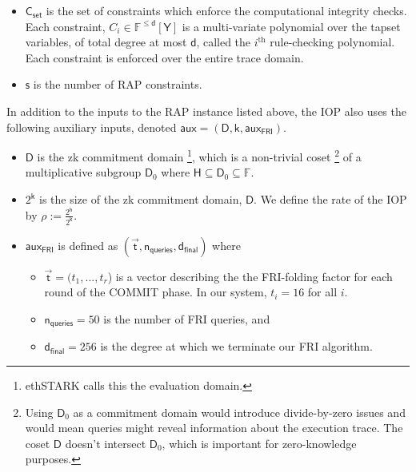 \documentclass[10pt,letterpaper,titlepage]{article}
\theoremstyle{definition}
\begin{document}
\begin{itemize}
  \footnote{A tap is a reference to an entry in the trace; the constraints are expressed as a function of various taps. For more details on taps, see Appendix \ref{taps}. Note that ethSTARK uses the term \textit{mask} where we use \textit{tapset}.}. 
  \item $\mathsf{C}_\mathsf{set}$ is the set of constraints which enforce the computational integrity checks. 
  Each constraint, $C_i\in\mathbb{F}^{\leq \mathsf{d}}[\mathsf{Y}]$ is a multi-variate polynomial over the tapset variables, of total degree at most $\mathsf{d}$, called the $i^\text{th}$ rule-checking polynomial. 
  Each constraint is enforced over the entire trace domain.
  \item $\mathsf{s}$ is the number of RAP constraints.
\end{itemize} 
In addition to the inputs to the RAP instance listed above, the IOP also uses the following auxiliary inputs, denoted $\mathsf{aux}=(\mathsf{D},\mathsf{k},\mathsf{aux}_\mathsf{FRI})$.
\begin{itemize}
  \item $\mathsf{D}$ is the zk commitment domain%
  \footnote{ethSTARK calls this the evaluation domain.}, which is a non-trivial coset%
  \footnote{Using $\mathsf{D}_0$ as a commitment domain would introduce divide-by-zero issues and would mean queries might reveal information about the execution trace. 
  The coset $\mathsf{D}$ doesn't intersect $\mathsf{D}_0$, which is important for zero-knowledge purposes.}
  of a multiplicative subgroup $\mathsf{D}_0$ where $\mathsf{H}\subseteq\mathsf{D}_0\subseteq\mathbb{F}$.
  \item $2^\mathsf{k}$ is the size of the zk commitment domain, $\mathsf{D}$. 
  We define the rate of the IOP by $\rho := \frac{2^\mathsf{h}}{2^\mathsf{k}}$. 
  \item $\mathsf{aux}_\mathsf{FRI}$ is defined as $(\vec{\mathsf{t}},\mathsf{n_{queries}}, \mathsf{d_{final}})$ where 
    \begin{itemize}
      \item $\vec{\mathsf{t}}=(t_1,...,t_r$) is a vector describing the the FRI-folding factor for each round of the COMMIT phase. In our system, $t_i=16$ for all $i$.
      \item $\mathsf{n_{queries}}=50$ is the number of FRI queries, and 
      \item $\mathsf{d_{final}}=256$ is the degree at which we terminate our FRI algorithm.
    \end{itemize}
\end{itemize}
\end{document}

